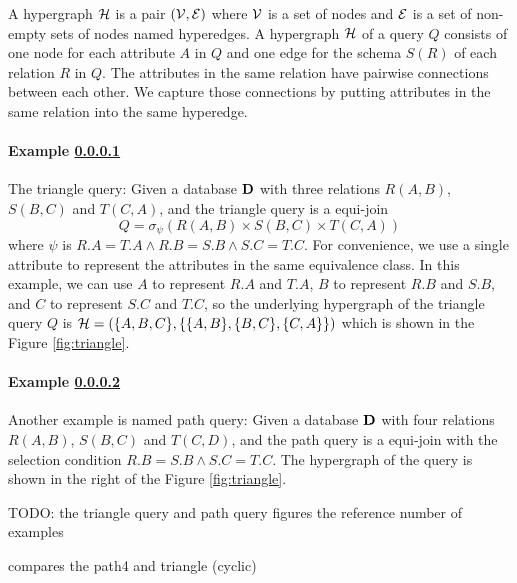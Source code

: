 A hypergraph $\mathcal{H}$ is a pair $(\mathcal{V}, \mathcal{E})$  where $\mathcal{V}$ is a set of nodes and $\mathcal{E}$ is a set of non-empty sets of nodes named hyperedges. A hypergraph $\mathcal{H}$ of a query $Q$ consists of one node for each attribute $A$ in $Q$ and one edge for the schema $S(R)$ of each relation $R$ in $Q$. The attributes in the same relation have pairwise connections between each other. We capture those connections by putting attributes in the same relation into the same hyperedge. 


\paragraph{Example \ref{example:triangle}}\label{example:triangle}
The triangle query: Given a database $\mathbf{D}$ with three relations $R(A,B)$, $S(B,C)$ and $T(C,A)$, and the triangle query is a equi-join
$$Q = \sigma_{\psi}(R(A,B)\times S(B,C) \times T(C,A))$$
where $\psi$ is $R.A = T.A \land R.B = S.B \land S.C = T.C$. For convenience, we use a single attribute to represent the attributes in the same equivalence class. In this example, we can use $A$ to represent $R.A$ and $T.A$, $B$ to represent $R.B$ and $S.B$, and $C$ to represent $S.C$ and $T.C$, so the underlying hypergraph of the triangle query $Q$ is $\mathcal{H} = (\{A,B,C\}, \{\{A,B\}, \{B,C\}, \{C,A\}\})$ which is shown in the Figure \ref{fig:triangle}. 




\paragraph{Example \ref{example:path4}}\label{example:path4}
Another example is named path query: Given a database $\mathbf{D}$ with four relations $R(A,B)$, $S(B,C)$ and $T(C,D)$, and the path query is a equi-join with the selection condition $R.B=S.B \land S.C=T.C$. The hypergraph of the query is shown in the right of the Figure \ref{fig:triangle}. 


TODO: 
the triangle query and path query figures 
the reference number of examples

compares the path4 and triangle (cyclic)




